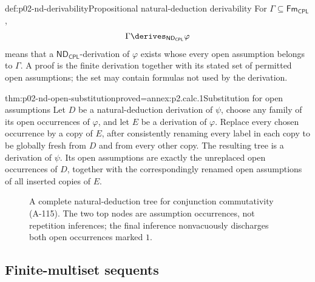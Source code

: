 \begin{hbdefinition}{def:p02-nd-derivability}{Propositional natural-deduction derivability}
For \(\Gamma\subseteq\mathsf{Fm}_{\mathsf{CPL}}\),
\[
 \Gamma\derives_{\mathsf{ND}_{\mathsf{CPL}}}\varphi
\]
means that a \(\mathsf{ND}_{\mathsf{CPL}}\)-derivation of \(\varphi\)
exists whose every open assumption belongs to \(\Gamma\).  A proof is the
finite derivation together with its stated set of permitted open assumptions;
the set may contain formulas not used by the derivation.
\end{hbdefinition}

\begin{hblemma}{thm:p02-nd-open-substitution}{proved=annex:p2.calc.1}{Substitution for open assumptions}
Let \(D\) be a natural-deduction derivation of \(\psi\), choose any family
of its open occurrences of \(\varphi\), and let \(E\) be a derivation of
\(\varphi\).  Replace every chosen occurrence by a copy of \(E\), after
consistently renaming every label in each copy to be globally fresh from
\(D\) and from every other copy.  The resulting tree is a derivation of
\(\psi\).  Its open assumptions are exactly the unreplaced open occurrences
of \(D\), together with the correspondingly renamed open assumptions of all
inserted copies of \(E\).
\end{hblemma}

\begin{figure}[htbp]
\centering
{}
\caption{A complete natural-deduction tree for conjunction commutativity
(A-115).  The two top nodes are assumption occurrences, not repetition
inferences; the final inference nonvacuously discharges both open occurrences
marked \(1\).}
\label{fig:p02-nd-tree}
\end{figure}

\subsection{Finite-multiset sequents}
\label{sec:p02-sequents}

